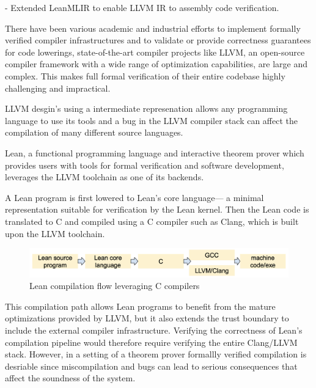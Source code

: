 - Extended LeanMLIR to enable LLVM IR to assembly code verification.














There have been various academic and industrial efforts to implement formally verified compiler infrastructures and to validate or provide correctness guarantees for code lowerings, state-of-the-art compiler projects like LLVM, an open-source compiler framework with a wide range of optimization capabilities,  are large and complex. This makes full formal verification of their entire codebase highly challenging and impractical.


LLVM desgin's using a intermediate represenation allows any programming language to use its tools and a bug in the LLVM compiler stack can affect the compilation of many different source languages.

Lean, a functional programming language and interactive theorem prover which provides users with tools for formal verification and software development, leverages the LLVM toolchain as one of its backends. 

A Lean program is first lowered to Lean’s core language— a minimal representation suitable for verification by the Lean kernel. Then the  Lean code is translated to C and compiled using a C compiler such as Clang, which is built upon the LLVM toolchain.

\begin{figure}[htbp]
  \centering
  \includegraphics[scale=0.37]{thesis/Lean_Compilation_Pipeline.png}
 
  \caption{Lean compilation flow leveraging C compilers}
  \label{fig:your-label}
\end{figure}

This compilation path allows Lean programs to benefit from the mature optimizations provided by LLVM, but it also extends the trust boundary to include the external compiler infrastructure. Verifying the correctness of Lean’s compilation pipeline would therefore require verifying the entire Clang/LLVM stack.
However, in a setting of a theorem prover formallly verified compilation is desriable since miscompilation and bugs can lead to serious consequences that affect the soundness of the system. 

